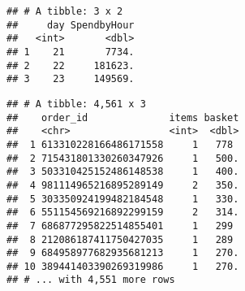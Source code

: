 \documentclass[]{article}
\newenvironment{Shaded}{\begin{snugshade}}{\end{snugshade}}
\newcommand{\KeywordTok}[1]{\textcolor[rgb]{0.13,0.29,0.53}{\textbf{#1}}}
\newcommand{\DataTypeTok}[1]{\textcolor[rgb]{0.13,0.29,0.53}{#1}}
\newcommand{\DecValTok}[1]{\textcolor[rgb]{0.00,0.00,0.81}{#1}}
\newcommand{\FloatTok}[1]{\textcolor[rgb]{0.00,0.00,0.81}{#1}}
\newcommand{\StringTok}[1]{\textcolor[rgb]{0.31,0.60,0.02}{#1}}
\newcommand{\CommentTok}[1]{\textcolor[rgb]{0.56,0.35,0.01}{\textit{#1}}}
\newcommand{\OperatorTok}[1]{\textcolor[rgb]{0.81,0.36,0.00}{\textbf{#1}}}
\newcommand{\NormalTok}[1]{#1}
\begin{document}
\begin{verbatim}
## # A tibble: 3 x 2
##     day SpendbyHour
##   <int>       <dbl>
## 1    21       7734.
## 2    22     181623.
## 3    23     149569.
\end{verbatim}

\begin{Shaded}
\end{Shaded}

\begin{verbatim}
## # A tibble: 4,561 x 3
##    order_id              items basket
##    <chr>                 <int>  <dbl>
##  1 613310228166486171558     1   778 
##  2 715431801330260347926     1   500.
##  3 503310425152486148538     1   400.
##  4 981114965216895289149     2   350.
##  5 303350924199482184548     1   330.
##  6 551154569216892299159     2   314.
##  7 686877295822514855401     1   299 
##  8 212086187411750427035     1   289 
##  9 684958977682935681213     1   270.
## 10 389441403390269319986     1   270.
## # ... with 4,551 more rows
\end{verbatim}

\begin{Shaded}
\end{Shaded}
\end{document}
